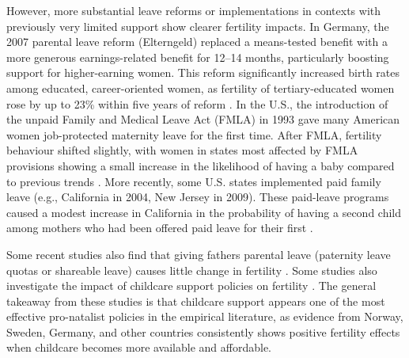 \documentclass[a4paper,oneside,final,onecolumn,11pt,english]{article}
\begin{document}
However, more substantial leave reforms or implementations in contexts with previously very limited support show clearer fertility impacts. In Germany, the 2007 parental leave reform (Elterngeld) replaced a means-tested benefit with a more generous earnings-related benefit for 12–14 months, particularly boosting support for higher-earning women. This reform significantly increased birth rates among educated, career-oriented women, as fertility of tertiary-educated women rose by up to 23\% within five years of reform \citep{raute2019can}. In the U.S., the introduction of the unpaid Family and Medical Leave Act (FMLA) in 1993 gave many American women job-protected maternity leave for the first time. After FMLA, fertility behaviour shifted slightly, with women in states most affected by FMLA provisions showing a small increase in the likelihood of having a baby compared to previous trends \citep{cannonier2014does}. More recently, some U.S. states implemented paid family leave (e.g., California in 2004, New Jersey in 2009). These paid-leave programs caused a modest increase in California in the probability of having a second child among mothers who had been offered paid leave for their first \citep{golightly2022does, bailey2025long}. 

Some recent studies also find that giving fathers parental leave (paternity leave quotas or shareable leave) causes little change in fertility \citep{lee2009childcare, cools2015causal, farre2019does, duvander2020impact}. %
Some studies also investigate the impact of childcare support policies on fertility \citep{rindfuss2010child, havnes2011no, mork2013childcare, bauernschuster2016children, wood2019local}. The general takeaway from these studies is that childcare support appears one of the most effective pro-natalist policies in the empirical literature, as evidence from Norway, Sweden, Germany, and other countries consistently shows positive fertility effects when childcare becomes more available and affordable. 
\end{document}
